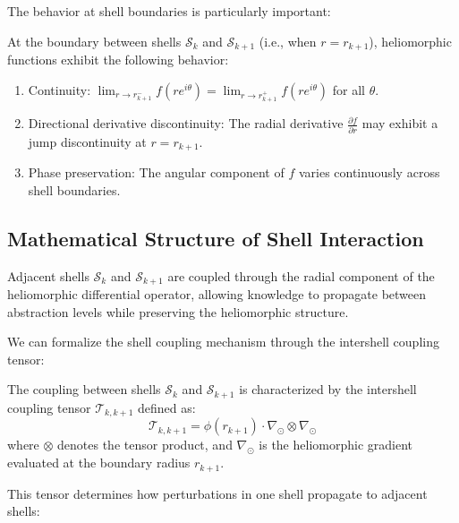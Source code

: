 The behavior at shell boundaries is particularly important:

\begin{theorem}
At the boundary between shells $\mathcal{S}_k$ and $\mathcal{S}_{k+1}$ (i.e., when $r = r_{k+1}$), heliomorphic functions exhibit the following behavior:
\begin{enumerate}
    \item Continuity: $\lim_{r \to r_{k+1}^-} f(re^{i\theta}) = \lim_{r \to r_{k+1}^+} f(re^{i\theta})$ for all $\theta$.
    \item Directional derivative discontinuity: The radial derivative $\frac{\partial f}{\partial r}$ may exhibit a jump discontinuity at $r = r_{k+1}$.
    \item Phase preservation: The angular component of $f$ varies continuously across shell boundaries.
\end{enumerate}
\end{theorem}

\subsection{Mathematical Structure of Shell Interaction}

\begin{corollary}
Adjacent shells $\mathcal{S}_k$ and $\mathcal{S}_{k+1}$ are coupled through the radial component of the heliomorphic differential operator, allowing knowledge to propagate between abstraction levels while preserving the heliomorphic structure.
\end{corollary}

We can formalize the shell coupling mechanism through the intershell coupling tensor:

\begin{definition}
The coupling between shells $\mathcal{S}_k$ and $\mathcal{S}_{k+1}$ is characterized by the intershell coupling tensor $\mathcal{T}_{k,k+1}$ defined as:
\begin{equation}
\mathcal{T}_{k,k+1} = \phi(r_{k+1}) \cdot \nabla_{\odot} \otimes \nabla_{\odot}
\end{equation}
where $\otimes$ denotes the tensor product, and $\nabla_{\odot}$ is the heliomorphic gradient evaluated at the boundary radius $r_{k+1}$.
\end{definition}

This tensor determines how perturbations in one shell propagate to adjacent shells:


